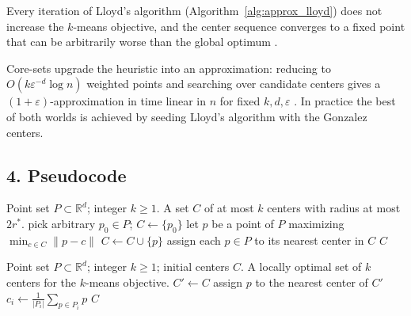 \begin{theorem}\label{thm:approx_lloyd_monotone}
  Every iteration of Lloyd's algorithm
  (Algorithm~\ref{alg:approx_lloyd}) does not increase the $k$-means
  objective, and the center sequence converges to a fixed point that can be
  arbitrarily worse than the global optimum \cite{lloyd1982}.
\end{theorem}

Core-sets upgrade the heuristic into an approximation: reducing to
$O(k \varepsilon^{-d} \log n)$ weighted points and searching over candidate
centers gives a $(1 + \varepsilon)$-approximation in time linear in $n$ for
fixed $k, d, \varepsilon$ \cite{harpeled2004}. In practice the best of both
worlds is achieved by seeding Lloyd's algorithm with the Gonzalez centers.

\subsection{4. Pseudocode}

\begin{algorithm}[htbp]
\caption{Farthest-Point $k$-Center (Gonzalez)}
\label{alg:approx_gonzalez_kcenter}
\begin{algorithmic}[1]
\Require Point set $P \subset \mathbb{R}^d$; integer $k \geq 1$.
\Ensure A set $C$ of at most $k$ centers with radius at most $2 r^*$.
  \State pick arbitrary $p_0 \in P$; $C \gets \{p_0\}$
    \State let $p$ be a point of $P$ maximizing $\min_{c \in C}\|p - c\|$
    \State $C \gets C \cup \{p\}$
  \EndFor
  \State assign each $p \in P$ to its nearest center in $C$
  \State \Return $C$
\EndFunction
\end{algorithmic}
\end{algorithm}

\begin{algorithm}[htbp]
\caption{Lloyd's Algorithm ($k$-Means Heuristic)}
\label{alg:approx_lloyd}
\begin{algorithmic}[1]
\Require Point set $P \subset \mathbb{R}^d$; integer $k \geq 1$; initial centers $C$.
\Ensure A locally optimal set of $k$ centers for the $k$-means objective.
  \Repeat
    \State $C' \gets C$
     assign $p$ to the nearest center of $C'$ \EndFor
     $c_i \gets \frac{1}{|P_i|}\sum_{p \in P_i} p$ \EndFor
  \State \Return $C$
\EndFunction
\end{algorithmic}
\end{algorithm}

